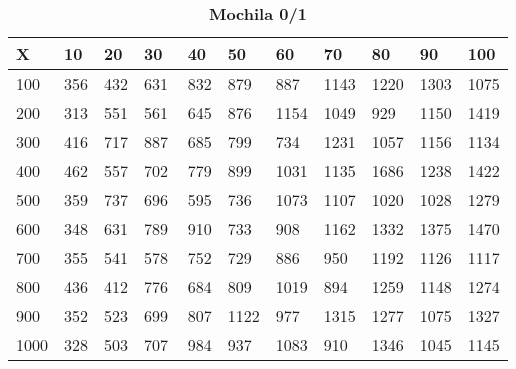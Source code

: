 \documentclass[10pt,letterpaper]{article}
\begin{document}
\newpage 
{}
\begin{center}
\begin{table}\renewcommand{\arraystretch}{2.5}
\caption{\large \textbf{Mochila 0/1}}
\centering
\begin{tabular} { |m{0.5cm}|m{1.3cm}|m{1.3cm}|m{1.3cm}|m{1.3cm}|m{1.3cm}|m{1.3cm}|m{1.3cm}|m{1.3cm}|m{1.3cm}|m{1.3cm}|} 
\hline
\rowcolor{Gray}
\centering \textbf{X} & \centering \textbf{10} & \centering \textbf{20} & \centering \textbf{30}\ & \centering \textbf{40} & \centering \textbf{50} & \centering \textbf{60}\ & \centering \textbf{70} & \centering \textbf{80} & \centering \textbf{90}\ & \textbf{100} \\\hline
\cellcolor{Gray}100 & \Large 356 & \Large 432 & \Large 631 & \Large 832 & \Large 879 & \Large 887 & \Large 1143 & \Large 1220 & \Large 1303 & \Large 1075 \\
\hline
\cellcolor{Gray}200 & \Large 313 & \Large 551 & \Large 561 & \Large 645 & \Large 876 & \Large 1154 & \Large 1049 & \Large 929 & \Large 1150 & \Large 1419 \\
\hline
\cellcolor{Gray}300 & \Large 416 & \Large 717 & \Large 887 & \Large 685 & \Large 799 & \Large 734 & \Large 1231 & \Large 1057 & \Large 1156 & \Large 1134 \\
\hline
\cellcolor{Gray}400 & \Large 462 & \Large 557 & \Large 702 & \Large 779 & \Large 899 & \Large 1031 & \Large 1135 & \Large 1686 & \Large 1238 & \Large 1422 \\
\hline
\cellcolor{Gray}500 & \Large 359 & \Large 737 & \Large 696 & \Large 595 & \Large 736 & \Large 1073 & \Large 1107 & \Large 1020 & \Large 1028 & \Large 1279 \\
\hline
\cellcolor{Gray}600 & \Large 348 & \Large 631 & \Large 789 & \Large 910 & \Large 733 & \Large 908 & \Large 1162 & \Large 1332 & \Large 1375 & \Large 1470 \\
\hline
\cellcolor{Gray}700 & \Large 355 & \Large 541 & \Large 578 & \Large 752 & \Large 729 & \Large 886 & \Large 950 & \Large 1192 & \Large 1126 & \Large 1117 \\
\hline
\cellcolor{Gray}800 & \Large 436 & \Large 412 & \Large 776 & \Large 684 & \Large 809 & \Large 1019 & \Large 894 & \Large 1259 & \Large 1148 & \Large 1274 \\
\hline
\cellcolor{Gray}900 & \Large 352 & \Large 523 & \Large 699 & \Large 807 & \Large 1122 & \Large 977 & \Large 1315 & \Large 1277 & \Large 1075 & \Large 1327 \\
\hline
\cellcolor{Gray}1000 & \Large 328 & \Large 503 & \Large 707 & \Large 984 & \Large 937 & \Large 1083 & \Large 910 & \Large 1346 & \Large 1045 & \Large 1145 \\
\hline
\end{tabular} \\
\end{table}
\end{center}
\end{document}
